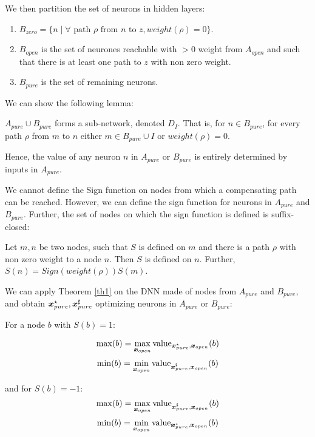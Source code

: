 We then partition the set of neurons in hidden layers: 
\begin{enumerate}
	\item $B_{zero}= \{n \mid \forall \text{ path $\rho$ from $n$ to } z, weight(\rho)=0\}$.
	\item $B_{open}$ is the set of neurones reachable with $>0$ weight from $A_{open}$ and such that there is at least one path to $z$ with non zero weight.
	\item $B_{pure}$ is the set of remaining neurons.
\end{enumerate}

We can show the following lemma:

\begin{lemma}
	$A_{pure} \cup B_{pure} $ forms a sub-network, denoted $D_I$. That is, 
	for $n \in B_{pure}$, for every path $\rho$ from $m$ to $n$
	either $m \in B_{pure}\cup I$ or $weight(\rho)=0$.
\end{lemma}

Hence, the value of any neuron $n$ in $A_{pure}$ or $B_{pure}$ is entirely determined by 
inputs in $A_{pure}$. 


We cannot define the Sign function on nodes from which a compensating path can be reached.
However, we can define the sign function for neurons in $A_{pure}$ and $B_{pure}$.
Further, the set of nodes on which the sign function is defined is suffix-closed:

\begin{lemma}
	Let $m,n$ be two nodes, such that $S$ is defined on $m$ and there is a path $\rho$ with non zero weight to a node $n$. Then $S$ is defined on $n$.
	Further, $S(n)= Sign(weight(\rho)) S(m)$.
\end{lemma}

We can apply Theorem \ref{th1} on the DNN made of nodes from $A_{pure}$ and $B_{pure}$, and obtain $\boldsymbol{x}_{pure}^\star,\boldsymbol{x}_{pure}^\sharp$ optimizing neurons in $A_{pure}$ or $B_{pure}$:

\begin{proposition}
For a node $b$ with $S(b)=1$:

$$\max(b)=\max_{\boldsymbol{x}_{open}} {\textrm{value}}_{\boldsymbol{x}^{\star}_{pure},\boldsymbol{x}_{open}}(b)$$
$$\min(b)=\min_{\boldsymbol{x}_{open}} {\textrm{value}}_{\boldsymbol{x}^{\sharp}_{pure},\boldsymbol{x}_{open}}(b)$$

and for $S(b)=-1$:
$$\max(b)=\max_{\boldsymbol{x}_{open}} {\textrm{value}}_{\boldsymbol{x}^{\sharp}_{pure},\boldsymbol{x}_{open}}(b)$$
$$\min(b)=\min_{\boldsymbol{x}_{open}} {\textrm{value}}_{\boldsymbol{x}^{\star}_{pure},\boldsymbol{x}_{open}}(b)$$
\end{proposition}

